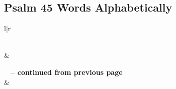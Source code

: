 

\subsection{Psalm 45 Words Alphabetically}


\normalsize
 
\begin{center}
\begin{longtable}{l|r}
\caption[Psalm 45 Words Alphabetically]{Psalm 45 Words Alphabetically}\label{table:WordsAlphabetically for Psalm 45} \\
\hline {} &  \\ \hline 
\endfirsthead
 
{{\bfseries \tablename\ \thetable{} -- continued from previous page}} \\  
\hline {} &  \\ \hline 
\endhead
 

\end{longtable}
\end{center}
